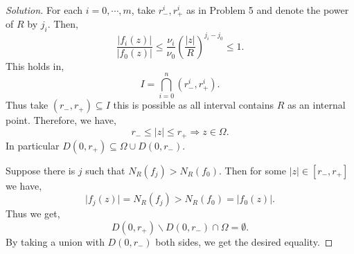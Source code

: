 \documentclass[8pt]{article}
\numberwithin{equation}{section}
\newenvironment{solution}{\begin{proof}[Solution]}{\end{proof}}
\newcommand{\ab}[1]{\vert #1 \vert}
\begin{document}
\begin{solution}
  For each $i=0,\cdots,m$, take $r^i_-,r_+^i$ as in Problem 5 and denote the power of $R$ by $j_i$. Then,
  \begin{equation*}
    {\frac {\ab{f_i(z)}} {\ab{f_0(z)}}}\leq {\frac {\nu_i} {\nu_0}}\left({\frac {\ab{z}} R}\right)^{j_i-j_0}\leq 1.
  \end{equation*}
  This holds in,
  \begin{equation*}
    I = \bigcap_{i=0}^n (r_-^i,r_+^i).
  \end{equation*}
  Thus take $(r_-,r_+)\subseteq I$ this is possible as all interval contains $R$ as an internal point. Therefore, we have,
  \begin{equation*}
    r_-\leq \ab{z}\leq r_+\Rightarrow z\in \Omega.
  \end{equation*}
  In particular $D(0,r_+)\subseteq\Omega\cup D(0,r_-)$.
  \par Suppose there is $j$ such that $N_R(f_j)>N_R(f_0)$. Then for some $\ab{z}\in[r_-,r_+]$ we have,
  \begin{equation*}
    \ab{f_j(z)} = N_R(f_j)>N_R(f_0)=\ab{f_0(z)}.
  \end{equation*}
Thus we get,
\begin{equation*}
  D(0,r_+)\backslash D(0,r_-)\cap\Omega = \emptyset.
\end{equation*}
By taking a union with $D(0,r_-)$ both sides, we get the desired equality.
\end{solution}
\end{document}
